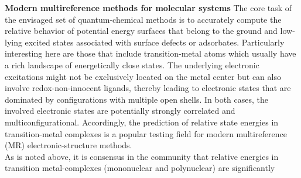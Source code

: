 \documentclass[a4paper,11pt,headings=normal]{scrartcl}
\begin{document}
\begin{itemize}
\noindent
\textbf{Modern multireference methods for molecular systems} 
The core task of the envisaged set of quantum-chemical methods is to accurately 
compute the relative behavior of potential energy surfaces that belong to 
the ground and low-lying excited states associated with surface defects or 
adsorbates. Particularly interesting here are those that include transition-metal 
atoms which usually have a rich landscape of energetically close 
states.\autocite{Chan2019, Hirsch2025} 
The underlying electronic excitations might not be exclusively located 
on the metal center but can also involve redox-non-innocent ligands, thereby 
leading to electronic states that are dominated by configurations with multiple 
open shells.\autocite{Nam2024} In both cases, the involved 
electronic states are potentially strongly correlated and multiconfigurational. 
Accordingly, the prediction of relative state energies in transition-metal
complexes is a popular testing field for modern multireference (MR) 
electronic-structure methods.\autocite{Radon2018, LiManni2021, 
Pantazis2022, Evangelista2024}\\
\ifoot{}
\ofoot{}
 As is noted above, it is consensus in the community that relative energies in 
transition metal-complexes (mononuclear and polynuclear) are significantly 

\end{itemize}
\end{document}
